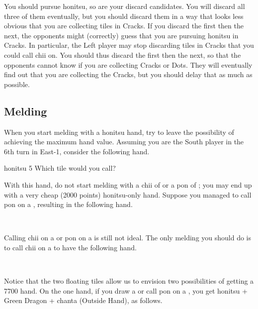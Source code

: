 \bigskip
\noindent You should pursue {\jap honitsu}, so {\large{}} are your discard candidates. You will discard all three of them eventually, but you should discard them in a way that looks less obvious that you are collecting tiles in Cracks. 
If you discard the {\large{}} first then the {\large{}} next, the opponents might (correctly) guess that you are pursuing {\jap honitsu} in Cracks. 
In particular, the Left player may stop discarding tiles in Cracks that you could call {\jap chii} on. You should thus discard the {\large{}} first then the {\large{}} next, so that the opponents cannot know if you are collecting Cracks or Dots. They will eventually find out that you are collecting the Cracks, but you should delay that as much as possible. 

\newpage
\subsection{Melding}
When you start melding with a {\jap honitsu} hand, try to leave the possibility of achieving the maximum hand value. Assuming you are the South player in the 6th turn in East-1, consider the following hand.

\begin{itembox}[r]{{\jap honitsu} 5}
\bp
{}\xi\bei\bei\fa\fa
\ep
\vspace{-10pt}Which tile would you call? \vspace{-5pt}
\end{itembox}

\bigskip
\noindent With this hand, do not start melding with a {\jap chii} of {\large{}} or a {\jap pon} of {\large\bei}; you may end up with a very cheap (2000 points) {\jap honitsu}-only hand. 
Suppose you managed to call {\jap pon} on a {\large\fa}, resulting in the following hand. 

\bp
{}\xi\bei\bei~\fa\rfa\fa
\ep

\noindent Calling {\jap chii} on a {\large{}} or {\jap pon} on a {\large\bei} is still not ideal. The only melding you should do is to call {\jap chii} on a {\large{}} to have the following hand.

\bp
{}\xi\bei\bei~~\fa\rfa\fa
\ep

Notice that the two floating tiles {\large{} \xi} allow us to envision two possibilities of getting a 7700 hand. 
On the one hand, if you draw a {\large\xi} or call {\jap pon} on a {\large\bei}, you get {\jap honitsu} + Green Dragon + {\jap chanta} (Outside Hand), as follows.

